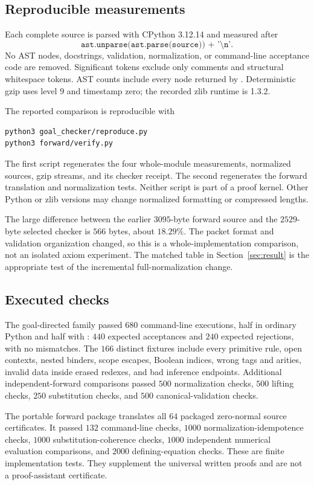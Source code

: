 \subsection{Reproducible measurements}

Each complete source is parsed with CPython 3.12.14 and measured after
\[
 \texttt{ast.unparse(ast.parse(source)) + '\textbackslash n'}.
\]
No AST nodes, docstrings, validation, normalization, or command-line
acceptance code are removed. Significant tokens exclude only comments
and structural whitespace tokens. AST counts include every node
returned by . Deterministic gzip uses level $9$ and
timestamp zero; the recorded zlib runtime is 1.3.2.

The reported comparison is reproducible with
\begin{lstlisting}
python3 goal_checker/reproduce.py
python3 forward/verify.py
\end{lstlisting}
The first script regenerates the four whole-module measurements,
normalized sources, gzip streams, and its checker receipt.
The second regenerates the forward translation and normalization tests.
Neither script is part of a proof kernel. Other Python or zlib versions
may change normalized formatting or compressed lengths.

The large difference between the earlier $3095$-byte forward source and
the $2529$-byte selected checker is $566$ bytes, about $18.29\%$.
The packet format and validation organization changed, so this is a
whole-implementation comparison, not an isolated axiom experiment.
The matched table in Section~\ref{sec:result} is the appropriate test
of the incremental full-normalization change.

\subsection{Executed checks}

The goal-directed family passed $680$ command-line executions,
half in ordinary Python and half with : $440$ expected
acceptances and $240$ expected rejections, with no mismatches.
The $166$ distinct fixtures include every primitive rule, open
contexts, nested binders, scope escapes, Boolean indices, wrong
tags and arities, invalid data inside erased redexes, and bad
inference endpoints. Additional independent-forward comparisons
passed $500$ normalization checks, $500$ lifting checks, $250$
substitution checks, and $500$ canonical-validation checks.

The portable forward package translates all $64$ packaged
zero-normal source certificates. It passed $132$ command-line
checks, $1000$ normalization-idempotence checks, $1000$
substitution-coherence checks, $1000$ independent numerical
evaluation comparisons, and $2000$ defining-equation checks.
These are finite implementation tests. They supplement the
universal written proofs and are not a proof-assistant certificate.

